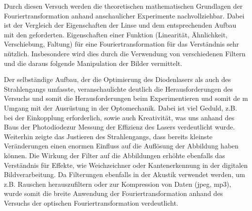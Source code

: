 


Durch diesen Versuch werden die theoretischen mathematischen Grundlagen der Fouriertransformation anhand anschaulicher Experimente nachvollziehbar. Dabei ist der Vergleich der Eigenschaften der Linse und dem entsprechenden Aufbau mit den geforderten. Eigenschaften einer Funktion (Linearität, Ähnlichkeit, Verschiebung, Faltung) für eine Fouriertransformation für das Verständnis sehr nützlich. Insbesondere wird dies durch die Verwendung von verschiedenen Filtern und die daraus folgende Manipulation der Bilder vermittelt. 

Der selbständige Aufbau, der die Optimierung des Diodenlasers als auch des Strahlengangs umfasste, veranschaulichte deutlich die Herausforderungen des Versuchs und somit die Herausforderungen beim Experimentieren und somit de
m Umgang mit der Ausrüstung in der Optomechanik. Dabei ist viel Geduld, z.B. bei der Einkopplung erforderlich, sowie auch Kreativität, was uns anhand des Baus der Photodiodezur Messung der Effizienz des Lasers verdeutlicht wurde. Weiterhin zeigte das Justieren des Strahlengangs, dass bereits kleinste Veränderungen einen enormen Einfluss auf die Auflösung der Abbildung haben können.
Die Wirkung der Filter auf die Abbildungen erhöhte ebenfalls das Verständnis für Effekte, wie Weichzeichner oder Kantenerkennung in der digitalen Bildverarbeitung. Da Filterungen ebenfalls in der Akustik verwendet werden, um z.B. Rauschen herauszufiltern oder zur Kompression von Daten (jpeg, mp3), wurde somit die breite Anwendung der Fouriertransformation anhand des Versuchs der optischen Fouriertransformation verdeutlicht.